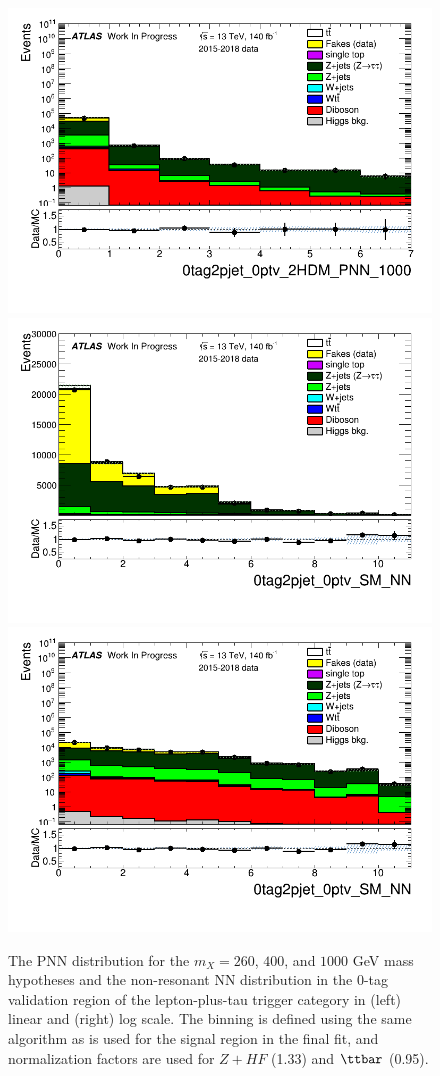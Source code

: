 \begin{figure}
\includegraphics[width=.45\textwidth]{figures/lephadFF/LTT/0tag2pjet_0ptv_2HDM_PNN_1000_LTT_ALLFAKES_Bulb_noNeg_log.png}\\
\includegraphics[width=.45\textwidth]{figures/lephadFF/LTT/0tag2pjet_0ptv_SM_NN_LTT_ALLFAKES_Bulb_noNeg_lin.png}
\includegraphics[width=.45\textwidth]{figures/lephadFF/LTT/0tag2pjet_0ptv_SM_NN_LTT_ALLFAKES_Bulb_noNeg_log.png}
\caption{The PNN distribution for the $m_{X} = 260$, $400$, and $1000$ GeV mass hypotheses and the non-resonant NN distribution in the $0$-tag validation region of the lepton-plus-tau trigger category in (left) linear and (right) log scale. The binning is defined using the same algorithm as is used for the signal region in the final fit, and normalization factors are used for $Z+HF$ (1.33) and $\ttbar$ (0.95).}
\label{fig:LTT_0tag}
\end{figure}    

